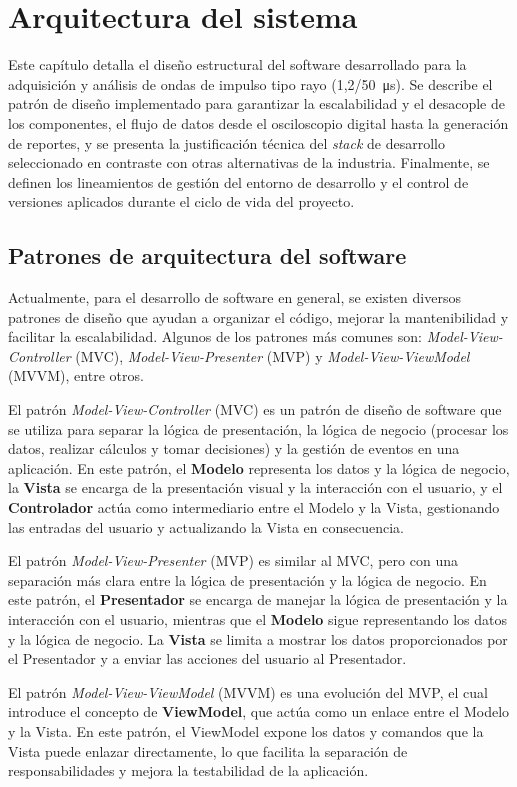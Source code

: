 \newpage
\chapter{Arquitectura del sistema}
\vspace{3\baselineskip}

Este capítulo detalla el diseño estructural del software desarrollado para la adquisición y análisis de ondas de impulso tipo rayo (\SI[parse-numbers=false]{1,2/50}{\micro\second}). Se describe el patrón de diseño implementado para garantizar la escalabilidad y el desacople de los componentes, el flujo de datos desde el osciloscopio digital hasta la generación de reportes, y se presenta la justificación técnica del \textit{stack} de desarrollo seleccionado en contraste con otras alternativas de la industria. Finalmente, se definen los lineamientos de gestión del entorno de desarrollo y el control de versiones aplicados durante el ciclo de vida del proyecto.\par

\section{Patrones de arquitectura del software}

Actualmente, para el desarrollo de software en general, se existen diversos patrones de diseño que ayudan a organizar el código, mejorar la mantenibilidad y facilitar la escalabilidad. Algunos de los patrones más comunes son: \textit{Model-View-Controller} (MVC), \textit{Model-View-Presenter} (MVP) y \textit{Model-View-ViewModel} (MVVM), entre otros.\par

El patrón \textit{Model-View-Controller} (MVC) es un patrón de diseño de software que se utiliza para separar la lógica de presentación, la lógica de negocio (procesar los datos, realizar cálculos y tomar decisiones) y la gestión de eventos en una aplicación. En este patrón, el \textbf{Modelo} representa los datos y la lógica de negocio, la \textbf{Vista} se encarga de la presentación visual y la interacción con el usuario, y el \textbf{Controlador} actúa como intermediario entre el Modelo y la Vista, gestionando las entradas del usuario y actualizando la Vista en consecuencia.\par
El patrón \textit{Model-View-Presenter} (MVP) es similar al MVC, pero con una separación más clara entre la lógica de presentación y la lógica de negocio. En este patrón, el \textbf{Presentador} se encarga de manejar la lógica de presentación y la interacción con el usuario, mientras que el \textbf{Modelo} sigue representando los datos y la lógica de negocio. La \textbf{Vista} se limita a mostrar los datos proporcionados por el Presentador y a enviar las acciones del usuario al Presentador.\par
El patrón \textit{Model-View-ViewModel} (MVVM) es una evolución del MVP, el cual introduce el concepto de \textbf{ViewModel}, que actúa como un enlace entre el Modelo y la Vista. En este patrón, el ViewModel expone los datos y comandos que la Vista puede enlazar directamente, lo que facilita la separación de responsabilidades y mejora la testabilidad de la aplicación.\par

